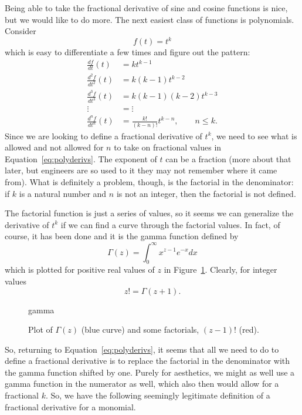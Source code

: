 Being able to take the fractional derivative of sine and cosine functions is nice, but we would like to do more. The next easiest class of functions is polynomials. Consider 
\begin{equation}
  f(t) = t^k
  \label{eq:poly}
\end{equation}
which is easy to differentiate a few times and figure out the pattern:
\begin{align}
  \frac{df}{dt}(t) &= k t^{k-1} \\
  \frac{d^2f}{dt^2}(t) &= k \left( k-1 \right) t^{k-2} \\
  \frac{d^3f}{dt^3}(t) &= k \left( k-1 \right) \left( k - 2 \right) t^{k-3} \\
  \vdots &= \vdots \\
  \frac{d^nf}{dt^n}(t) &= \frac{k!}{\left( k - n \right)!} t^{k-n}, \qquad n \leq k.
  \label{eq:polyderivs}
\end{align}
Since we are looking to define a fractional derivative of $t^k$, we need to see what is allowed and not allowed for $n$ to take on fractional values in Equation~\ref{eq:polyderivs}. The exponent of $t$ can be a fraction (more about that later, but engineers are so used to it they may not remember where it came from). What is definitely a problem, though, is the factorial in the denominator: if $k$ is a natural number and $n$ is not an integer, then the factorial is not defined.

The factorial function is just a series of values, so it seems we can generalize the derivative of $t^k$ if we can find a curve through the factorial values. In fact, of course, it has been done and it is the gamma function defined by
\begin{equation}
  \Gamma\left(z\right) = \int_0^\infty x^{z - 1} e^{-x} dx
  \label{eq:gamma}
\end{equation}
which is plotted for positive real values of $z$ in Figure~\ref{fig:gamma}. Clearly, for integer values
\begin{equation}
  z! = \Gamma\left( z + 1 \right).
\end{equation}

\begin{figure}
  \centering
  {gamma}
  \caption{Plot of $\Gamma(z)$ (blue curve) and some factorials, $\left(z - 1\right)!$ (red).}
  \label{fig:gamma}
\end{figure}

So, returning to Equation~\ref{eq:polyderivs}, it seems that all we need to do to define a fractional derivative is to replace the factorial in the denominator with the gamma function shifted by one. Purely for aesthetics, we might as well use a gamma function in the numerator as well, which also then would allow for a fractional $k$. So, we have the following seemingly legitimate definition of a fractional derivative for a monomial.

